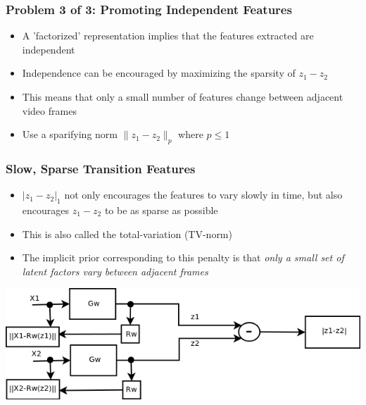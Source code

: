 \documentclass{beamer}
\begin{document}
\begin{frame}
\frametitle{Problem 3 of 3: Promoting Independent Features}  
\begin{itemize}
\item A 'factorized' representation implies that the features extracted are independent
\item Independence can be encouraged by maximizing the sparsity of $z_1 - z_2$ 
\item This means that only a small number of features change between adjacent video frames
\item Use a sparifying norm $\|z_1-z_2\|_p$ where $p \leq 1$    
\end{itemize}
\end{frame} 

\begin{frame}
\frametitle{Slow, Sparse Transition Features} 
\begin{itemize}
\item $|z_1 - z_2|_1$ not only encourages the features to vary slowly in time, but also encourages $z_1 - z_2$ to be as sparse as possible
\item This is also called the total-variation (TV-norm)  
\item The implicit prior corresponding to this penalty is that \emph{only a small set of latent factors vary between adjacent frames}
\end{itemize}
\begin{center}
\includegraphics[scale = 0.4]{./figures/sfa_diag.png} 
\end{center} 
\end{frame} 
\end{document}
